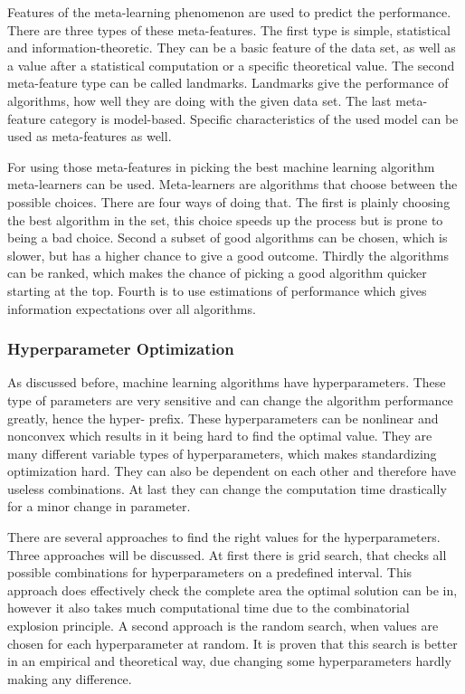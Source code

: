 \documentclass[10pt,a4paper]{article}
\begin{document}
	Features of the meta-learning phenomenon are used to predict the performance. There are three types of these meta-features. The first type is simple, statistical and information-theoretic. They can be a basic feature of the data set, as well as a value after a statistical computation or a specific theoretical value. The second meta-feature type can be called landmarks. Landmarks give the performance of algorithms, how well they are doing with the given data set. The last meta-feature category is model-based. Specific characteristics of the used model can be used as meta-features as well. \cite{brazdil1994characterizing, vilalta2004using}

	For using those meta-features in picking the best machine learning algorithm meta-learners can be used. Meta-learners are algorithms that choose between the possible choices. There are four ways of doing that. The first is plainly choosing the best algorithm in the set, this choice speeds up the process but is prone to being a bad choice. Second a subset of good algorithms can be chosen, which is slower, but has a higher chance to give a good outcome. Thirdly the algorithms can be ranked, which makes the chance of picking a good algorithm quicker starting at the top. Fourth is to use estimations of performance which gives information expectations over all algorithms. \cite{brazdil2009development}

	\subsubsection{Hyperparameter Optimization}
	\label{subsubsec:Hyperparameter optimization}

	As discussed before, machine learning algorithms have hyperparameters. These type of parameters are very sensitive and can change the algorithm performance greatly, hence the hyper- prefix. These hyperparameters can be nonlinear and nonconvex which results in it being hard to find the optimal value. They are many different variable types of hyperparameters, which makes standardizing optimization hard. They can also be dependent on each other and therefore have useless combinations. At last they can change the computation time drastically for a minor change in parameter. \cite{claesen2015hyperparameter}

	There are several approaches to find the right values for the hyperparameters. Three approaches will be discussed. At first there is grid search, that checks all possible combinations for hyperparameters on a predefined interval. This approach does effectively check the complete area the optimal solution can be in, however it also takes much computational time due to the combinatorial explosion principle. \cite{hsu2003practical} A second approach is the random search, when values are chosen for each hyperparameter at random. It is proven that this search is better in an empirical and theoretical way, due changing some hyperparameters hardly making any difference. \cite{bergstra2012random} 
	
\end{document}
